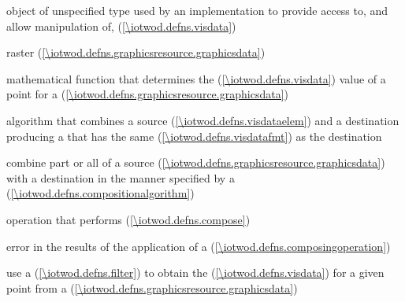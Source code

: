 %
%
 object of unspecified type used by an implementation to provide access to, and allow manipulation of,  (\ref{\iotwod.defns.visdata})

\indexdefn{\pixmap}%
raster  (\ref{\iotwod.defns.graphicsresource.graphicsdata})

%
mathematical function that determines the  (\ref{\iotwod.defns.visdata}) value of a point for a  (\ref{\iotwod.defns.graphicsresource.graphicsdata})

%
algorithm that combines a source  (\ref{\iotwod.defns.visdataelem}) and a destination  producing a  that has the same  (\ref{\iotwod.defns.visdatafmt}) as the destination 

%
combine part or all of a source  (\ref{\iotwod.defns.graphicsresource.graphicsdata}) with a destination  in the manner specified by a  (\ref{\iotwod.defns.compositionalgorithm})

%
operation that performs  (\ref{\iotwod.defns.compose})

%
error in the results of the application of a  (\ref{\iotwod.defns.composingoperation})

%
use a  (\ref{\iotwod.defns.filter}) to obtain the  (\ref{\iotwod.defns.visdata}) for a given point from a  (\ref{\iotwod.defns.graphicsresource.graphicsdata})

